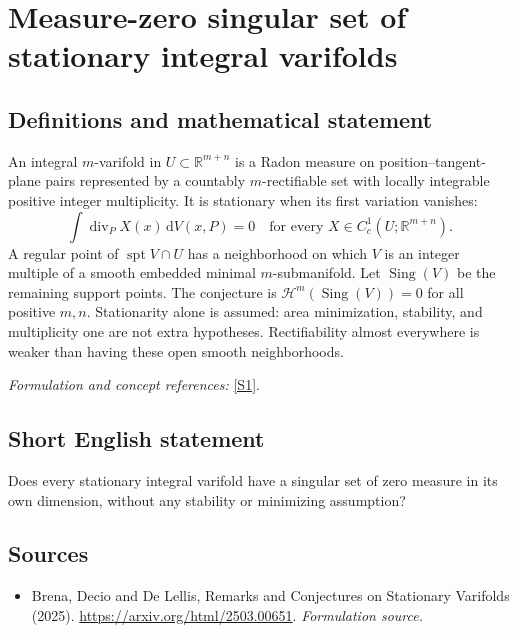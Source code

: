 \documentclass[11pt]{article}
\begin{document}
\section*{\texorpdfstring{Measure-zero singular set of stationary integral varifolds}{Measure-zero singular set of stationary integral varifolds}}\label{30006915}
\subsection{Definitions and mathematical statement}
An integral $m$-varifold in $U\subset{\mathbb{R}}^{m+n}$ is a Radon measure on position--tangent-plane pairs represented by a countably $m$-rectifiable set with locally integrable positive integer multiplicity. It is stationary when its first variation vanishes:
\[
 \int\operatorname{div}_P X(x){\,\mathrm{d}} V(x,P)=0
 \quad\text{for every }X\in C_c^1(U;{\mathbb{R}}^{m+n}).
\]
A regular point of $\operatorname{spt}V\cap U$ has a neighborhood on which $V$ is an integer multiple of a smooth embedded minimal $m$-submanifold. Let $\operatorname{Sing}(V)$ be the remaining support points. The conjecture is $\mathcal H^m(\operatorname{Sing}(V))=0$ for all positive $m,n$. Stationarity alone is assumed: area minimization, stability, and multiplicity one are not extra hypotheses. Rectifiability almost everywhere is weaker than having these open smooth neighborhoods.
\par\smallskip\textit{Formulation and concept references:} \href{https://arxiv.org/html/2503.00651}{[S1]}.

\subsection{Short English statement}
Does every stationary integral varifold have a singular set of zero measure in its own dimension, without any stability or minimizing assumption?
\subsection{Sources}
\begin{itemize}
\item[S1]Brena, Decio and De Lellis, Remarks and Conjectures on Stationary Varifolds (2025).
\url{https://arxiv.org/html/2503.00651}.
\textit{Formulation source.}
\end{itemize}
\end{document}
